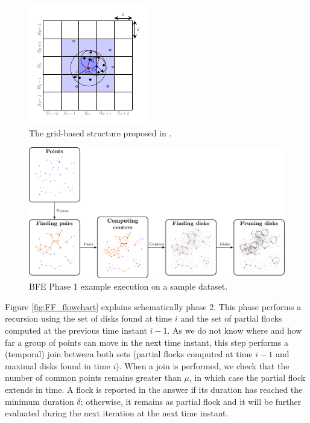 \begin{figure}
    \centering
    \includegraphics[width=0.5\linewidth]{pflocks_paper/figures/grid_prime}
    \caption{The grid-based structure proposed in \cite{vieira_2009}.}\label{fig:grid}
\end{figure}

\begin{figure}
    \centering
    \includegraphics[width=\linewidth]{pflocks_paper/figures/MF_stages2/flow}
    \caption{BFE Phase 1 example execution on a sample dataset.}\label{fig:MF_stages}
\end{figure}

Figure \ref{fig:FF_flowchart} explains schematically phase 2. This phase performs a recursion using the set of disks found at time $i$ and the set of partial flocks computed at the  previous time instant $i-1$.  As we do not know where and how far a group of points can move in the next time instant, this step performs a (temporal) join between both sets (partial flocks computed at time $i-1$ and maximal disks found in time $i$).  When a join is performed, we check that the number of common points remains greater than $\mu$, in which case the partial flock extends in time. A flock is reported in the answer if its duration has reached the minimum duration $\delta$; otherwise, it remains as partial flock and it will be further evaluated during the next iteration at the next time instant.

